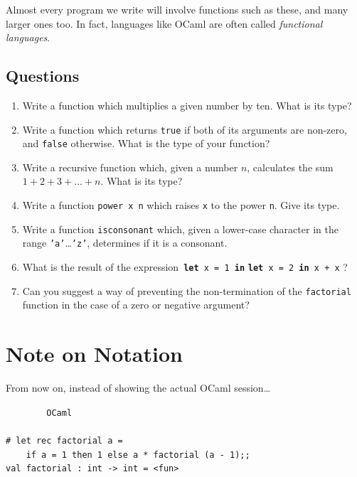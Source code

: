\documentclass[]{book}
\newcommand{\smspace}{\vspace{4mm}}
\begin{document}
\noindent Almost every program we write will involve functions such as these, and many larger ones too. In fact, languages like OCaml are often called \textit{functional languages}.

\clearpage
\section*{Questions}

\begin{enumerate}
 \item Write a function which multiplies a given number by ten. What is its type?
 \item Write a function which returns \texttt{true} if both of its arguments are non-zero, and \texttt{false} otherwise. What is the type of your function?
 \item Write a recursive function which, given a number $n$, calculates the sum $1 + 2 + 3 + \ldots + n$. What is its type?
 \item Write a function \texttt{power x n} which raises \texttt{x} to the power \texttt{n}. Give its type.
 \item Write a function \texttt{isconsonant} which, given a lower-case character in the range \texttt{'a'}\ldots\texttt{'z'}, determines if it is a consonant.
 \item What is the result of the expression\, \textbf{\texttt{let}}\texttt{ x = 1 }\textbf{\texttt{in}} \textbf{\texttt{let}}\texttt{ x = 2 }\textbf{\texttt{in}}\texttt{ x + x} ?
 \item Can you suggest a way of preventing the non-termination of the \texttt{factorial} function in the case of a zero or negative argument?
\end{enumerate}

\cleardoublepage
\pagestyle{empty}

\pagestyle{empty}

\chapter*{Note on Notation}

From now on, instead of showing the actual OCaml session\ldots

\smspace
\noindent\verb!        OCaml!\\
\noindent\\
\noindent\verb!# let rec factorial a =!\\
\noindent\verb!    if a = 1 then 1 else a * factorial (a - 1);;!\\
\noindent\verb!val factorial : int -> int = <fun>!
\smspace
\end{document}
